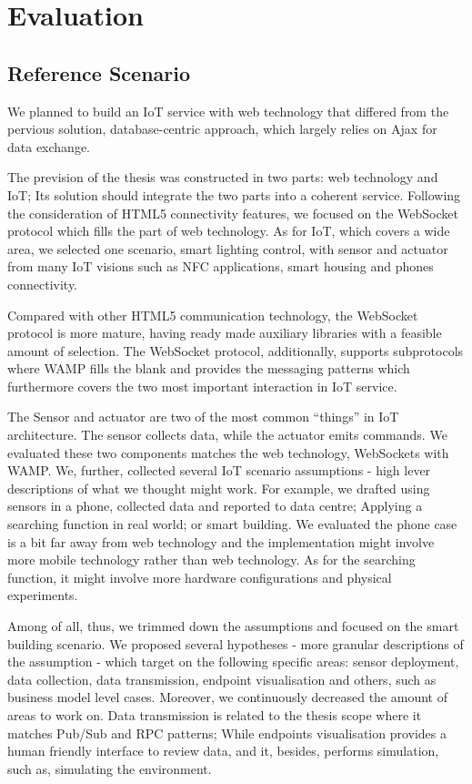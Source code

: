 \chapter{Evaluation}
\label{chapter:evaluation}

\section{Reference Scenario}
We planned to build an IoT service with web technology that differed from the pervious solution, database-centric approach, which largely relies on Ajax for data exchange. 

The prevision of the thesis was constructed in two parts: web technology and IoT; Its solution should integrate the two parts into a coherent service. Following the consideration of HTML5 connectivity features, we focused on the WebSocket protocol which fills the part of web technology. As for IoT, which covers a wide area, we selected one scenario, smart lighting control, with sensor and actuator from many IoT visions such as NFC applications, smart housing and phones connectivity. 

Compared with other HTML5 communication technology, the WebSocket protocol is more mature, having ready made auxiliary libraries with a feasible amount of selection. The WebSocket protocol, additionally, supports subprotocols where WAMP fills the blank and provides the messaging patterns which furthermore covers the two most important interaction in IoT service.

The Sensor and actuator are two of the most common ``things'' in IoT architecture. The sensor collects data, while the actuator emits commands. We evaluated these two components matches the web technology, WebSockets with WAMP. We, further, collected several IoT scenario assumptions - high lever descriptions of what we thought might work. For example, we drafted using sensors in a phone, collected data and reported to data centre; Applying a searching function in real world; or smart building. We evaluated the phone case is a bit far away from web technology and the implementation might involve more mobile technology rather than web technology. As for the searching function, it might involve more hardware configurations and physical experiments. 

Among of all, thus, we trimmed down the assumptions and focused on the smart building scenario. We proposed several hypotheses - more granular descriptions of the assumption - which target on the following specific areas: sensor deployment, data collection, data transmission, endpoint visualisation and others, such as business model level cases. Moreover, we continuously decreased the amount of areas to work on. Data transmission is related to the thesis scope where it matches Pub/Sub and RPC patterns; While endpoints visualisation provides a human friendly interface to review data, and it, besides, performs simulation, such as, simulating the environment.

